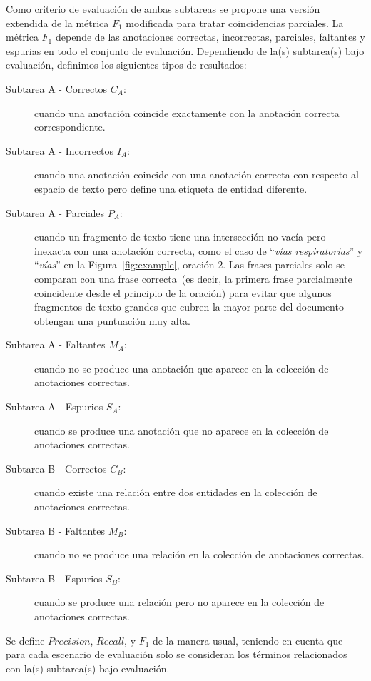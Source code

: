 Como criterio de evaluación de ambas subtareas se propone una versión extendida de la métrica $F_1$ modificada para tratar coincidencias parciales. La métrica $F_1$ depende de las anotaciones correctas, incorrectas, parciales, faltantes y espurias en todo el conjunto de evaluación. Dependiendo de la(s) subtarea(s) bajo evaluación, definimos los siguientes tipos de resultados:

\begin{description}
    \item[Subtarea A - Correctos $C_A$:] cuando una anotación coincide exactamente con la anotación correcta correspondiente.
    \item[Subtarea A - Incorrectos $I_A$:] cuando una anotación coincide con una anotación correcta con respecto al espacio de texto pero define una etiqueta de entidad diferente.
    \item[Subtarea A - Parciales $P_A$:] cuando un fragmento de texto tiene una intersección no vacía pero inexacta con una anotación correcta, como el caso de ``\textit{vías respiratorias}'' y ``\textit{vías}'' en la Figura~\ref{fig:example}, oración 2.
          Las frases parciales solo se comparan con una frase correcta~(es decir, la primera frase parcialmente coincidente desde el principio de la oración) para evitar que algunos fragmentos de texto grandes que cubren la mayor parte del documento obtengan una puntuación muy alta.
    \item [Subtarea A - Faltantes $M_A$:] cuando no se produce una anotación que aparece en la colección de anotaciones correctas.
    \item [Subtarea A - Espurios $S_A$:] cuando se produce una anotación que no aparece en la colección de anotaciones correctas.
\end{description}

\begin{description}
    \item[Subtarea B - Correctos $C_B$:] cuando existe una relación entre dos entidades en la colección de anotaciones correctas.
    \item[Subtarea B - Faltantes $M_B$:] cuando no se produce una relación en la colección de anotaciones correctas.
    \item[Subtarea B - Espurios $S_B$:] cuando se produce una relación pero no aparece en la colección de anotaciones correctas.
\end{description}

Se define $Precision$, $Recall$, y $F_1$ de la manera usual, teniendo en cuenta que para cada escenario de evaluación solo se consideran los términos relacionados con la(s) subtarea(s) bajo evaluación.

